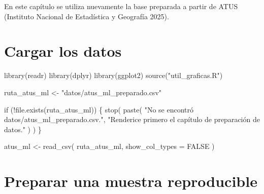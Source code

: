\documentclass[
  spanish,
  10.5pt,
  letterpaper,
  openany,
  headings=big]{scrbook}
\newenvironment{Shaded}{}{}
\newcommand{\AttributeTok}[1]{\textcolor[rgb]{0.84,0.23,0.29}{#1}}
\newcommand{\ConstantTok}[1]{\textcolor[rgb]{0.00,0.36,0.77}{#1}}
\newcommand{\ControlFlowTok}[1]{\textcolor[rgb]{0.84,0.23,0.29}{#1}}
\newcommand{\FunctionTok}[1]{\textcolor[rgb]{0.44,0.26,0.76}{#1}}
\newcommand{\NormalTok}[1]{\textcolor[rgb]{0.14,0.16,0.18}{#1}}
\newcommand{\OtherTok}[1]{\textcolor[rgb]{0.44,0.26,0.76}{#1}}
\newcommand{\SpecialCharTok}[1]{\textcolor[rgb]{0.00,0.36,0.77}{#1}}
\newcommand{\StringTok}[1]{\textcolor[rgb]{0.01,0.18,0.38}{#1}}
\begin{document}
En este capítulo se utiliza nuevamente la base preparada a partir de
ATUS (Instituto Nacional de Estadística y Geografía 2025).

\section{Cargar los datos}\label{cargar-los-datos}

\begin{Shaded}
\begin{Highlighting}[]
\FunctionTok{library}\NormalTok{(readr)}
\FunctionTok{library}\NormalTok{(dplyr)}
\FunctionTok{library}\NormalTok{(ggplot2)}
\FunctionTok{source}\NormalTok{(}\StringTok{"util\_graficas.R"}\NormalTok{)}

\NormalTok{ruta\_atus\_ml }\OtherTok{\textless{}{-}} \StringTok{"datos/atus\_ml\_preparado.csv"}

\ControlFlowTok{if}\NormalTok{ (}\SpecialCharTok{!}\FunctionTok{file.exists}\NormalTok{(ruta\_atus\_ml)) \{}
  \FunctionTok{stop}\NormalTok{(}
    \FunctionTok{paste}\NormalTok{(}
      \StringTok{"No se encontró datos/atus\_ml\_preparado.csv."}\NormalTok{,}
      \StringTok{"Renderice primero el capítulo de preparación de datos."}
\NormalTok{    )}
\NormalTok{  )}
\NormalTok{\}}

\NormalTok{atus\_ml }\OtherTok{\textless{}{-}} \FunctionTok{read\_csv}\NormalTok{(}
\NormalTok{  ruta\_atus\_ml,}
  \AttributeTok{show\_col\_types =} \ConstantTok{FALSE}
\NormalTok{)}
\end{Highlighting}
\end{Shaded}

\section{Preparar una muestra
reproducible}\label{preparar-una-muestra-reproducible}
\end{document}
